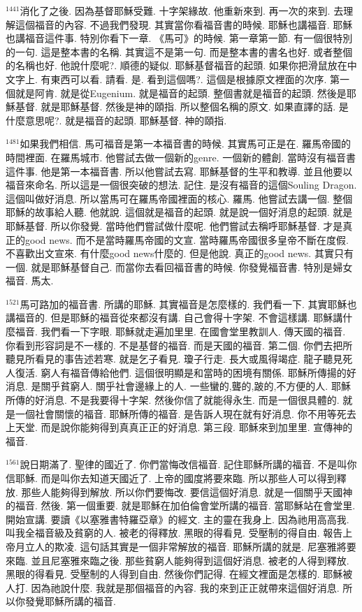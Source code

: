 \documentclass{book}
\begin{document}
$^{1441}$消化了之後.
因為基督耶穌受難.
十字架緣故.
他重新來到.
再一次的來到.
去理解這個福音的內容.
不過我們發現.
其實當你看福音書的時候.
耶穌也講福音.
耶穌也講福音這件事.
特別你看下一章.
《馬可》的時候.
第一章第一節.
有一個很特別的一句.
這是整本書的名稱.
其實這不是第一句.
而是整本書的書名也好.
或者整個的名稱也好.
他說什麼呢?.
順德的疑似.
耶穌基督福音的起頭.
如果你把滑鼠放在中文字上.
有東西可以看.
請看.
是.
看到這個嗎?.
這個是根據原文裡面的次序.
第一個就是阿肯.
就是從Eugenium.
就是福音的起頭.
整個書就是福音的起頭.
然後是耶穌基督.
就是耶穌基督.
然後是神的頤指.
所以整個名稱的原文.
如果直譯的話.
是什麼意思呢?.
就是福音的起頭.
耶穌基督.
神的頤指.

$^{1481}$如果我們相信.
馬可福音是第一本福音書的時候.
其實馬可正是在.
羅馬帝國的時間裡面.
在羅馬城市.
他嘗試去做一個新的genre.
一個新的體創.
當時沒有福音書這件事.
他是第一本福音書.
所以他嘗試去寫.
耶穌基督的生平和教導.
並且他要以福音來命名.
所以這是一個很突破的想法.
記住.
是沒有福音的這個Souling Dragon.
這個叫做好消息.
所以當馬可在羅馬帝國裡面的核心.
羅馬.
他嘗試去講一個.
整個耶穌的故事給人聽.
他就說.
這個就是福音的起頭.
就是說一個好消息的起頭.
就是耶穌基督.
所以你發覺.
當時他們嘗試做什麼呢.
他們嘗試去稱呼耶穌基督.
才是真正的good news.
而不是當時羅馬帝國的文宣.
當時羅馬帝國很多皇帝不斷在度假.
不喜歡出文宣來.
有什麼good news什麼的.
但是他說.
真正的good news.
其實只有一個.
就是耶穌基督自己.
而當你去看回福音書的時候.
你發覺福音書.
特別是婦女福音.
馬太.

$^{1521}$馬可路加的福音書.
所講的耶穌.
其實福音是怎麼樣的.
我們看一下.
其實耶穌也講福音的.
但是耶穌的福音從來都沒有講.
自己會得十字架.
不會這樣講.
耶穌講什麼福音.
我們看一下字眼.
耶穌就走遍加里里.
在國會堂里教訓人.
傳天國的福音.
你看到形容詞是不一樣的.
不是基督的福音.
而是天國的福音.
第二個.
你們去把所聽見所看見的事告述若寒.
就是乞子看見.
瓊子行走.
長大或風得竭症.
龍子聽見死人復活.
窮人有福音傳給他們.
這個很明顯是和當時的困境有關係.
耶穌所傳揚的好消息.
是關乎貧窮人.
關乎社會邊緣上的人.
一些蠻的,聾的,跛的,不方便的人.
耶穌所傳的好消息.
不是我要得十字架.
然後你信了就能得永生.
而是一個很具體的.
就是一個社會關懷的福音.
耶穌所傳的福音.
是告訴人現在就有好消息.
你不用等死去上天堂.
而是說你能夠得到真真正正的好消息.
第三段.
耶穌來到加里里.
宣傳神的福音.

$^{1561}$說日期滿了.
聖律的國近了.
你們當悔改信福音.
記住耶穌所講的福音.
不是叫你信耶穌.
而是叫你去知道天國近了.
上帝的國度將要來臨.
所以那些人可以得到釋放.
那些人能夠得到解放.
所以你們要悔改.
要信這個好消息.
就是一個關乎天國神的福音.
然後.
第一個重要.
就是耶穌在加伯倫會堂所講的福音.
當耶穌站在會堂里.
開始宣講.
要讀《以塞雅書特羅亞章》的經文.
主的靈在我身上.
因為祂用高高我.
叫我全福音級及貧窮的人.
被老的得釋放.
黑眼的得看見.
受壓制的得自由.
報告上帝月立人的欺凌.
這句話其實是一個非常解放的福音.
耶穌所講的就是.
尼塞雅將要來臨.
並且尼塞雅來臨之後.
那些貧窮人能夠得到這個好消息.
被老的人得到釋放.
黑眼的得看見.
受壓制的人得到自由.
然後你們記得.
在經文裡面是怎樣的.
耶穌被人打.
因為祂說什麼.
我就是那個福音的內容.
我的來到正正就帶來這個好消息.
所以你發覺耶穌所講的福音.
\end{document}
